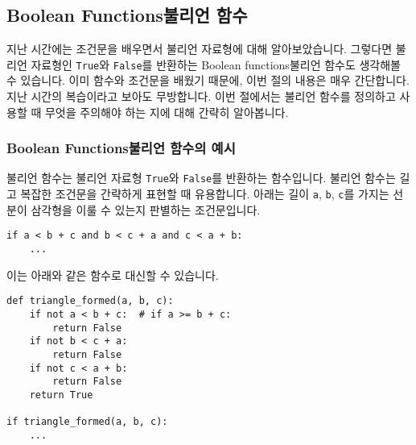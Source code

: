 \documentclass[../main.tex]{subfiles}
\begin{document}
\subsection{Boolean Functions불리언 함수}
지난 시간에는 조건문을 배우면서 불리언 자료형에 대해 알아보았습니다.
그렇다면 불리언 자료형인 \texttt{True}와 \texttt{False}를 반환하는 Boolean functions불리언 함수도 생각해볼 수 있습니다.
이미 함수와 조건문을 배웠기 때문에, 이번 절의 내용은 매우 간단합니다.
지난 시간의 복습이라고 보아도 무방합니다.
이번 절에서는 불리언 함수를 정의하고 사용할 때 무엇을 주의해야 하는 지에 대해 간략히 알아봅니다.

\subsubsection{Boolean Functions불리언 함수의 예시}
불리언 함수는 불리언 자료형 \texttt{True}와 \texttt{False}를 반환하는 함수입니다.
불리언 함수는 길고 복잡한 조건문을 간략하게 표현할 때 유용합니다.
아래는 길이 \texttt{a}, \texttt{b}, \texttt{c}를 가지는 선분이 삼각형을 이룰 수 있는지 판별하는 조건문입니다.
\begin{verbatim}
if a < b + c and b < c + a and c < a + b:
    ...
\end{verbatim} 
이는 아래와 같은 함수로 대신할 수 있습니다.
\begin{verbatim}
def triangle_formed(a, b, c):
    if not a < b + c:  # if a >= b + c:
        return False
    if not b < c + a:
        return False
    if not c < a + b:
        return False
    return True

if triangle_formed(a, b, c):
    ...
\end{verbatim}
\end{document}
